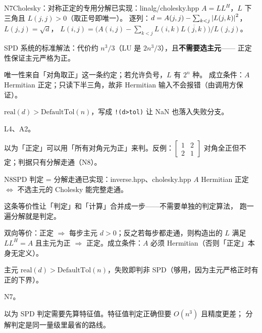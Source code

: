 \begin{know}{N7}{Cholesky：对称正定的专用分解}{已实现：linalg/cholesky.hpp}
 $A=LL^{H}$，$L$ 下三角且 $L(j,j)>0$（取正号即唯一）。
逐列：$d=A(j,j)-\sum_{k<j}\left\lvert L(j,k)\right\rvert^{2}$，$L(j,j)=\sqrt d$，
$L(i,j)=\big(A(i,j)-\sum_{k<j}L(i,k)\overline{L(j,k)}\big)/L(j,j)$。

 SPD 系统的标准解法：代价约 $n^{3}/3$（LU 是 $2n^{3}/3$），且\textbf{不需要选主元}——
正定性保证主元严格为正。

 唯一性来自「对角取正」这一条约定；若允许负号，$L$ 有 $2^{n}$ 种。
成立条件：$A$ Hermitian 正定；只读下半三角，故非 Hermitian 输入不会报错（由调用方保证）。

 $\mathrm{real}(d)>\mathrm{DefaultTol}(n)$，写成 \texttt{!(d>tol)} 让 NaN 也落入失败分支。

 L4、A2。

 以为「正定」可以用「所有对角元为正」来判。反例：$\begin{bmatrix}1&2\\2&1\end{bmatrix}$
对角全正但不定；判据只有分解走通（N8）。
\end{know}

\begin{know}{N8}{SPD 判定 = 分解走通}{已实现：inverse.hpp、cholesky.hpp}
 $A$ Hermitian 正定 $\iff$ 不选主元的 Cholesky 能完整走通。

 这条等价性让「判定」和「计算」合并成一步——不需要单独的判定算法，
跑一遍分解就是判定。

 双向等价：正定 $\Rightarrow$ 每步主元 $d>0$；反之若每步都走通，则构造出的 $L$ 满足 $LL^{H}=A$
且主元为正 $\Rightarrow$ 正定。成立条件：$A$ 必须 Hermitian（否则「正定」本身无定义）。

 主元 $\mathrm{real}(d)>\mathrm{DefaultTol}(n)$，失败即判非 SPD（够用，因为主元严格正时有正的下界）。

 N7。

 以为 SPD 判定需要先算特征值。特征值判定正确但要 $O(n^{3})$ 且精度更差；
分解判定是同一量级里最省的路线。
\end{know}

